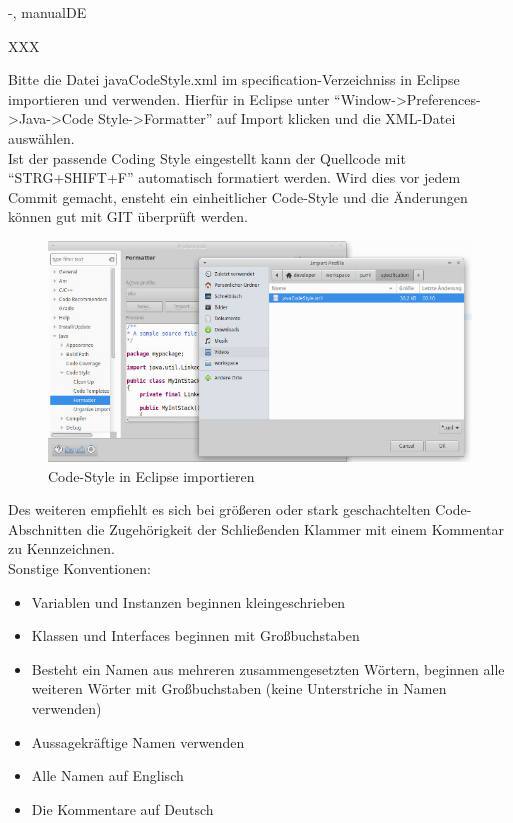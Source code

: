 \documentclass[twoside]{report}
\begin{document}
\begin{shownto}{-, manualDE}


XXX
\nsecend

Bitte die Datei javaCodeStyle.xml im specification-Verzeichniss in Eclipse importieren und verwenden.
Hierfür in Eclipse unter "`Window->Preferences->Java->Code Style->Formatter"' auf Import klicken und die XML-Datei auswählen.\\
Ist der passende Coding Style eingestellt kann der Quellcode mit "`STRG+SHIFT+F"' automatisch formatiert werden.
Wird dies vor jedem Commit gemacht, ensteht ein einheitlicher Code-Style und die Änderungen können gut mit GIT überprüft werden.\\
\begin{figure}[hbtp]
\centering
\includegraphics[scale=0.5]{Bilder/importCodeStyle}
\caption{Code-Style in Eclipse importieren}
\end{figure}
Des weiteren empfiehlt es sich bei größeren oder stark geschachtelten Code-Abschnitten die Zugehörigkeit der Schließenden Klammer mit einem Kommentar zu Kennzeichnen.\\
Sonstige Konventionen:
\begin{itemize}
\item{Variablen und Instanzen beginnen kleingeschrieben}
\item{Klassen und Interfaces beginnen mit Großbuchstaben}
\item{Besteht ein Namen aus mehreren zusammengesetzten Wörtern, beginnen alle weiteren Wörter mit Großbuchstaben (keine Unterstriche in Namen verwenden)}
\item{Aussagekräftige Namen verwenden}
\item{Alle Namen auf Englisch}
\item{Die Kommentare auf Deutsch}
\end{itemize}


\end{shownto}
\end{document}
